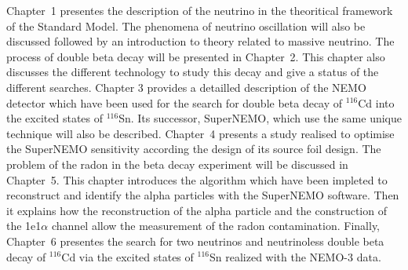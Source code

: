 \documentclass[main.tex]{subfiles}
\begin{document}
\bigskip

\NI Chapter~1 presentes the description of the neutrino in the theoritical framework of the Standard Model. The phenomena of neutrino oscillation will also be discussed followed by an introduction to theory related to massive neutrino. \NI The process of double beta decay will be presented in Chapter~2. This chapter also discusses the different technology to study this decay and give a status of the different searches. Chapter 3 provides a detailled description of the NEMO detector which have been used for the search for double beta decay of $^{\text{116}}$Cd into the excited states of $^{\text{116}}$Sn. Its successor, SuperNEMO, which use the same unique technique will also be described. Chapter~4 presents a study realised to optimise the SuperNEMO sensitivity according the design of its source foil design. The problem of the radon in the beta decay experiment will be discussed in Chapter~5. This chapter introduces the algorithm which have been impleted to reconstruct and identify the alpha particles with the SuperNEMO software. Then it explains how the reconstruction of the alpha particle and the construction of the 1e1$\alpha$ channel allow the measurement of the radon contamination. Finally, Chapter~6 presentes the search for two neutrinos and neutrinoless double beta decay of $^{\text{116}}$Cd via the excited states of $^{\text{116}}$Sn realized with the NEMO-3 data.
\end{document}
